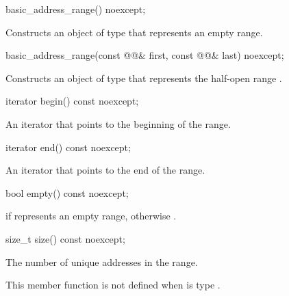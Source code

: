 \begin{itemdecl}
basic_address_range() noexcept;
\end{itemdecl}

\begin{itemdescr}
\pnum
\effects Constructs an object of type  that represents an empty range.
\end{itemdescr}

\begin{itemdecl}
basic_address_range(const @@& first,
                    const @@& last) noexcept;
\end{itemdecl}

\begin{itemdescr}
\pnum
\effects Constructs an object of type  that represents the half-open range .
\end{itemdescr}

\begin{itemdecl}
iterator begin() const noexcept;
\end{itemdecl}

\begin{itemdescr}
\pnum
\returns An iterator that points to the beginning of the range.
\end{itemdescr}

\begin{itemdecl}
iterator end() const noexcept;
\end{itemdecl}

\begin{itemdescr}
\pnum
\returns An iterator that points to the end of the range.
\end{itemdescr}

\begin{itemdecl}
bool empty() const noexcept;
\end{itemdecl}

\begin{itemdescr}
\pnum
\returns {} if  represents an empty range, otherwise .
\end{itemdescr}

\begin{itemdecl}
size_t size() const noexcept;
\end{itemdecl}

\begin{itemdescr}
\pnum
\returns The number of unique addresses in the range.

\pnum
\remarks This member function is not defined when  is type .
\end{itemdescr}

